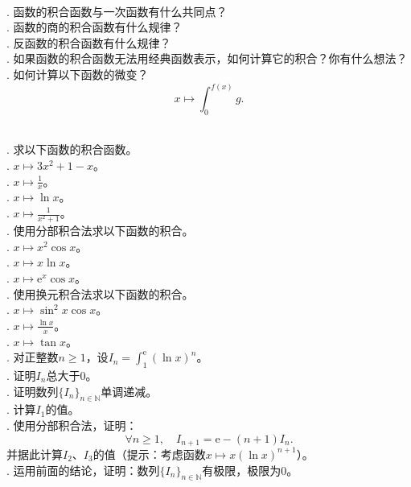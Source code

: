\documentclass[12pt,UTF8,fontset=none]{ctexbook}
\begin{document}
\begin{sk}
    \mbox{} \\
    . 函数的积合函数与一次函数有什么共同点？ \\
    . 函数的商的积合函数有什么规律？\\
    . 反函数的积合函数有什么规律？\\
    . 如果函数的积合函数无法用经典函数表示，如何计算它的积合？你有什么想法？\\
    . 如何计算以下函数的微变？
    $$x\mapsto \int_0^{f(x)} g.$$
\end{sk}

\begin{xt}
    \mbox{} \\
    . 求以下函数的积合函数。\\
    . $x\mapsto 3x^2 + 1 - x$。\\
    . $x\mapsto \frac{1}{x}$。\\
    . $x\mapsto \ln{x}$。\\
    . $x\mapsto \frac{1}{x^2 + 1}$。\\
    . 使用分部积合法求以下函数的积合。\\
    . $x\mapsto x^2 \cos{x}$。 \\
    . $x\mapsto x \ln{x} $。 \\
    . $x\mapsto \mathrm{e}^x \cos{x} $。 \\
    . 使用换元积合法求以下函数的积合。\\
    . $x\mapsto \sin^2{x} \cos{x}$。 \\
    . $x\mapsto \frac{\ln{x}}{x} $。 \\
    . $x\mapsto \tan{x} $。 \\
    . 对正整数$n\geqslant 1$，设$\displaystyle I_n = \int_1^{\mathrm{e}} \left(\ln{x}\right)^n$。\\
    . 证明$I_n$总大于$0$。\\
    . 证明数列$\{I_n\}_{n\in\mathbb{N}}$单调递减。\\
    . 计算$I_1$的值。\\
    . 使用分部积合法，证明：
    $$ \forall n \geqslant 1,\quad I_{n+1} = \mathrm{e} - (n+1)I_n.$$
    \indent 并据此计算$I_2$、$I_3$的值（提示：考虑函数$x\mapsto x\left(\ln{x}\right)^{n+1}$）。\\
    . 运用前面的结论，证明：数列$\{I_n\}_{n\in\mathbb{N}}$有极限，极限为$0$。\\

\end{xt}
\end{document}
